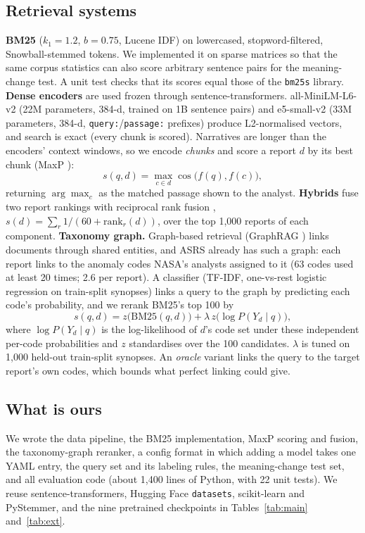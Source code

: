 \documentclass[conference]{IEEEtran}
\begin{document}
\subsection{Retrieval systems}
\textbf{BM25} \cite{robertson2009bm25} ($k_1{=}1.2$, $b{=}0.75$, Lucene IDF) on
lowercased, stopword-filtered, Snowball-stemmed tokens. We implemented it on sparse
matrices so that the same corpus statistics can also score arbitrary sentence pairs for
the meaning-change test. A unit test checks that its scores equal those of the
\texttt{bm25s} library.
\textbf{Dense encoders} are used frozen through sentence-transformers.
all-MiniLM-L6-v2 \cite{wang2020minilm,minilmcard} (22M parameters, 384-d, trained on 1B
sentence pairs) and e5-small-v2 \cite{wang2022e5} (33M parameters, 384-d,
\texttt{query:}/\texttt{passage:} prefixes) produce L2-normalised vectors, and search is
exact (every chunk is scored).
Narratives are longer than the encoders' context windows, so we encode \emph{chunks} and
score a report $d$ by its best chunk (MaxP \cite{dai2019maxp}):
\begin{equation}
s(q,d)=\max_{c\in d}\cos\big(f(q),f(c)\big),
\end{equation}
returning $\arg\max_c$ as the matched passage shown to the analyst.
\textbf{Hybrids} fuse two report rankings with reciprocal rank fusion \cite{cormack2009rrf},
$s(d)=\sum_{r}1/(60+\mathrm{rank}_r(d))$, over the top 1,000 reports of each component.
\textbf{Taxonomy graph.} Graph-based retrieval (GraphRAG \cite{edge2024graphrag}) links
documents through shared entities, and ASRS already has such a graph: each report links to the anomaly codes NASA's analysts assigned to it (63 codes used at least
20 times; 2.6 per report). A classifier (TF-IDF, one-vs-rest logistic regression on train-split synopses)
links a query to the graph by predicting each code's probability, and we rerank BM25's
top 100 by
\begin{equation}
s(q,d)=z\big(\mathrm{BM25}(q,d)\big)+\lambda\,z\big(\log P(Y_d\mid q)\big),
\end{equation}
where $\log P(Y_d\mid q)$ is the log-likelihood of $d$'s code set under these
independent per-code probabilities and $z$ standardises over the 100 candidates. $\lambda$
is tuned on 1,000 held-out train-split synopses. An \emph{oracle} variant links the query
to the target report's own codes, which bounds what perfect linking could give.

\subsection{What is ours}
We wrote the data pipeline, the BM25 implementation, MaxP scoring and fusion, the
taxonomy-graph reranker, a config format in which adding a model takes one YAML entry,
the query set and its labeling rules, the meaning-change test set, and all evaluation
code (about 1,400 lines of Python, with 22 unit tests). We reuse sentence-transformers,
Hugging Face \texttt{datasets}, scikit-learn and PyStemmer, and the nine pretrained
checkpoints in Tables~\ref{tab:main} and~\ref{tab:ext}.
\end{document}
